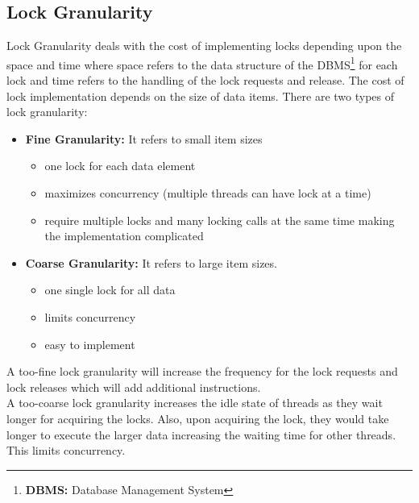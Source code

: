 \documentclass[12pt, a4paper]{report}
\begin{document}
\subsection{Lock Granularity}
Lock Granularity deals with the cost of implementing locks depending upon the space and time where space refers to the data structure of 
the DBMS{\footnote[3]{{\bfseries{DBMS:}} Database Management System}} for each lock and time refers to the handling of the lock requests 
and release. The cost of lock implementation depends on the size of data items. There are two types of lock granularity:
\begin{itemize}
    \item {\bfseries{Fine Granularity:}} It refers to small item sizes
            \begin{itemize}
                \item one lock for each data element
                \item maximizes concurrency (multiple threads can have lock at a time)
                \item require multiple locks and many locking calls at the same time making the implementation complicated
            \end{itemize}
    \item {\bfseries{Coarse Granularity:}} It refers to large item sizes. 
            \begin{itemize}
                \item one single lock for all data
                \item limits concurrency
                \item easy to implement
            \end{itemize}
\end{itemize}
A too-fine lock granularity will increase the frequency for the lock requests and lock releases which will add additional instructions.\\
A too-coarse lock granularity increases the idle state of threads as they wait longer for acquiring the locks. Also, upon acquiring the 
lock, they would take longer to execute the larger data increasing the waiting time for other threads. This limits concurrency.
\end{document}
